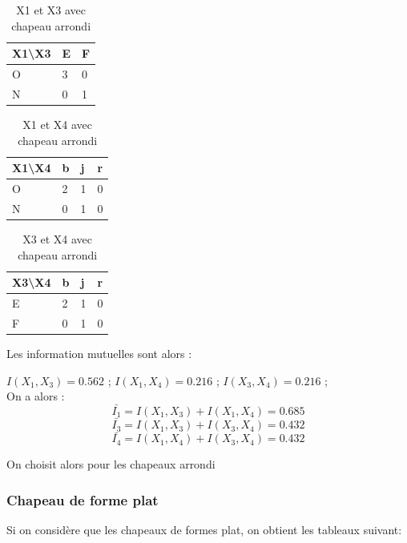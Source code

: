 \documentclass{article}
\begin{document}
\begin{table}[H]
  \centering
  \caption{X1 et X3 avec chapeau arrondi}
  \begin{tabular}{|l|l|l|}
  \hline
  X1\textbackslash{}X3 & E & F \\ \hline
  O                    & 3 & 0 \\ \hline
  N                    & 0 & 1 \\ \hline
  \end{tabular}
  \end{table}

  \begin{table}[h]
    \centering
    \caption{X1 et X4 avec chapeau arrondi}
    \begin{tabular}{|l|l|l|l|}
    \hline
    X1\textbackslash{}X4 & b & j & r \\ \hline
    O                    & 2 & 1 & 0 \\ \hline
    N                    & 0 & 1 & 0 \\ \hline
    \end{tabular}
    \end{table}

    \begin{table}[H]
      \centering
      \caption{X3 et X4 avec chapeau arrondi}
      \begin{tabular}{|l|l|l|l|}
      \hline
      X3\textbackslash{}X4 & b & j & r \\ \hline
      E                    & 2 & 1 & 0 \\ \hline
      F                    & 0 & 1 & 0 \\ \hline
      \end{tabular}
      \end{table}

Les information mutuelles sont alors :

$I(X_1,X_3)=0.562$ ;
$I(X_1,X_4)=0.216$ ;
$I(X_3,X_4)=0.216$ ;
\\
On a alors :
\[
\bar{I_1}=I(X_1,X_3) + I(X_1,X_4)= 0.685 
\]
\[
\bar{I_3}=I(X_1,X_3) + I(X_3,X_4)= 0.432 
\]
\[
\bar{I_4}=I(X_1,X_4) + I(X_3,X_4)= 0.432
\]

On choisit alors pour les chapeaux arrondi 
    


\subsubsection{Chapeau de forme plat}
Si on considère que les chapeaux de formes plat, on obtient les tableaux suivant: 
\end{document}
